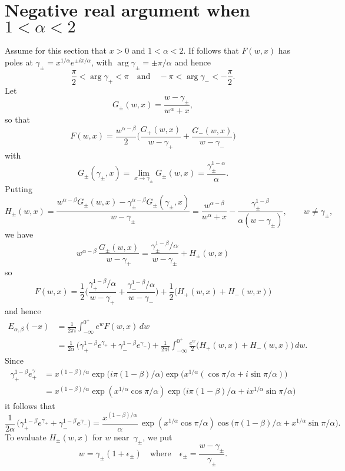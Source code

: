 \documentclass[12pt,a4paper]{article}
\begin{document}
\section{Negative real argument when $1<\alpha<2$}
Assume for this section that $x>0$ and $1<\alpha<2$.  If follows that $F(w,x)$
has poles at $\gamma_\pm=x^{1/\alpha}e^{\pm i\pi/\alpha}$, 
with $\arg\gamma_\pm=\pm\pi/\alpha$ and hence
\[
\frac{\pi}{2}<\arg\gamma_+<\pi
\quad\text{and}\quad
-\pi<\arg\gamma_-<-\frac{\pi}{2}.
\]
Let
\[
G_\pm(w,x)=\frac{w-\gamma_\pm}{w^\alpha+x},
\]
so that
\[
F(w,x)=\frac{w^{\alpha-\beta}}{2}\biggl(\frac{G_+(w,x)}{w-\gamma_+}
    +\frac{G_-(w,x)}{w-\gamma_-}\biggr)
\]
with
\[
G_\pm(\gamma_\pm,x)=\lim_{x\to\gamma_\pm}G_\pm(w,x)
    =\frac{\gamma_\pm^{1-\alpha}}{\alpha}.
\]
Putting
\[
H_\pm(w,x)=
\frac{w^{\alpha-\beta}G_\pm(w,x)-\gamma_\pm^{\alpha-\beta}G_\pm(\gamma_\pm,x)}%
{w-\gamma_\pm}=\frac{w^{\alpha-\beta}}{w^\alpha+x}
-\frac{\gamma_\pm^{1-\beta}}{\alpha(w-\gamma_\pm) } ,
\qquad w\ne\gamma_\pm,
\]
we have
\[
w^{\alpha-\beta}\,\frac{G_\pm(w,x)}{w-\gamma_+}
    =\frac{\gamma_\pm^{1-\beta}/\alpha}{w-\gamma_\pm }
    +H_\pm(w,x)
\]
so
\[
F(w,x)=\frac{1}{2}\biggl(
     \frac{\gamma_+^{1-\beta}/\alpha}{w-\gamma_+}
    +\frac{\gamma_-^{1-\beta}/\alpha}{w-\gamma_-}\biggr)
    +\frac{1}{2}\bigl(H_+(w,x)+H_-(w,x)\bigr)
\]
and hence
\begin{align*}
E_{\alpha,\beta}(-x)&=\frac{1}{2\pi i}\int_{-\infty}^{0^+}e^wF(w,x)\,dw\\
&=\frac{1}{2\alpha}\,\bigl(\gamma_+^{1-\beta}e^{\gamma_+}
    +\gamma_-^{1-\beta}e^{\gamma_-}\bigr)
     +\frac{1}{2\pi i}\int_{-\infty}^{0^+}
    \frac{e^w}{2} \bigl(H_+(w,x)+H_-(w,x)\bigr)\,dw.
\end{align*}
Since
\begin{align*}
\gamma_+^{1-\beta}e^\gamma_+&=x^{(1-\beta)/\alpha}
    \exp\bigl(i\pi(1-\beta)/\alpha\bigr)
    \exp\bigl(x^{1/\alpha}(\cos\pi/\alpha+i\sin\pi/\alpha)\bigr)\\
    &=x^{(1-\beta)/\alpha}\exp(x^{1/\alpha}\cos\pi/\alpha)
    \exp\bigl(i\pi(1-\beta)/\alpha+ix^{1/\alpha}\sin\pi/\alpha\bigr)
\end{align*}
it follows that
\[
\frac{1}{2\alpha}\,\bigl(\gamma_+^{1-\beta}e^{\gamma_+}
    +\gamma_-^{1-\beta}e^{\gamma_-}\bigr)
    =\frac{x^{(1-\beta)/\alpha}}{\alpha}\,\exp(x^{1/\alpha}\cos\pi/\alpha)
    \cos\bigl(\pi(1-\beta)/\alpha+x^{1/\alpha}\sin\pi/\alpha\bigr).
\]
To evaluate $H_\pm(w,x)$ for $w$ near~$\gamma_\pm$, we put
\[
w=\gamma_\pm(1+\epsilon_\pm)\quad\text{where}\quad
\epsilon_\pm=\frac{w-\gamma_\pm}{\gamma_\pm}.
\]
\end{document}
